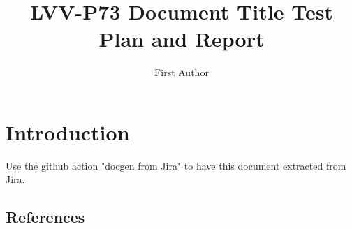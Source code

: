 \documentclass[DM,lsstdraft,toc]{lsstdoc}
\begin{document}
\def\milestoneName{Document Title}
\def\milestoneId{LVV-P73}
\def\product{Data Management}


\title{LVV-P73 Document Title Test Plan and Report}
\setDocRef{\lsstDocType-\lsstDocNum}
\date{\vcsDate}
\author{First Author}




\maketitle

\section{Introduction}
Use the github action "docgen from Jira" to have this document extracted from Jira.
\subsection{References}
\label{sect:references}
\renewcommand{\refname}{}




\end{document}
